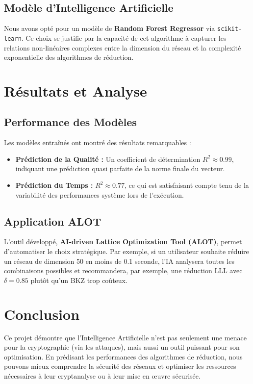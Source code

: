 \documentclass[12pt,a4paper]{article}
\begin{document}
\subsection{Modèle d'Intelligence Artificielle}
Nous avons opté pour un modèle de \textbf{Random Forest Regressor} via \texttt{scikit-learn}. Ce choix se justifie par la capacité de cet algorithme à capturer les relations non-linéaires complexes entre la dimension du réseau et la complexité exponentielle des algorithmes de réduction.

\section{Résultats et Analyse}

\subsection{Performance des Modèles}
Les modèles entraînés ont montré des résultats remarquables :
\begin{itemize}
    \item \textbf{Prédiction de la Qualité :} Un coefficient de détermination $R^2 \approx 0.99$, indiquant une prédiction quasi parfaite de la norme finale du vecteur.
    \item \textbf{Prédiction du Temps :} $R^2 \approx 0.77$, ce qui est satisfaisant compte tenu de la variabilité des performances système lors de l'exécution.
\end{itemize}

\subsection{Application ALOT}
L'outil développé, \textbf{AI-driven Lattice Optimization Tool (ALOT)}, permet d'automatiser le choix stratégique. Par exemple, si un utilisateur souhaite réduire un réseau de dimension 50 en moins de 0.1 seconde, l'IA analysera toutes les combinaisons possibles et recommandera, par exemple, une réduction LLL avec $\delta=0.85$ plutôt qu'un BKZ trop coûteux.

\section{Conclusion}
Ce projet démontre que l'Intelligence Artificielle n'est pas seulement une menace pour la cryptographie (via les attaques), mais aussi un outil puissant pour son optimisation. En prédisant les performances des algorithmes de réduction, nous pouvons mieux comprendre la sécurité des réseaux et optimiser les ressources nécessaires à leur cryptanalyse ou à leur mise en œuvre sécurisée.
\end{document}
